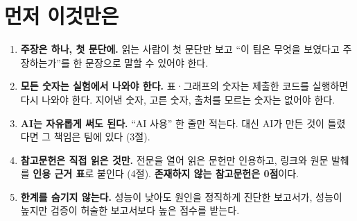 \documentclass[11pt]{article}
\begin{document}


\section*{먼저 이것만은}
\begin{enumerate}
\item \textbf{주장은 하나, 첫 문단에.} 읽는 사람이 첫 문단만 보고 ``이 팀은 무엇을 보였다고 주장하는가''를 한 문장으로 말할 수 있어야 한다.
\item \textbf{모든 숫자는 실험에서 나와야 한다.} 표·그래프의 숫자는 제출한 코드를 실행하면 다시 나와야 한다. 지어낸 숫자, 고른 숫자, 출처를 모르는 숫자는 없어야 한다.
\item \textbf{AI는 자유롭게 써도 된다.} ``AI 사용'' 한 줄만 적는다. 대신 AI가 만든 것이 틀렸다면 그 책임은 팀에 있다 (3절).
\item \textbf{참고문헌은 직접 읽은 것만.} 전문을 열어 읽은 문헌만 인용하고, 링크와 원문 발췌를 \textbf{인용 근거 표}로 붙인다 (4절). \textbf{존재하지 않는 참고문헌은 0점}이다.
\item \textbf{한계를 숨기지 않는다.} 성능이 낮아도 원인을 정직하게 진단한 보고서가, 성능이 높지만 검증이 허술한 보고서보다 높은 점수를 받는다.
\end{enumerate}
\end{document}
